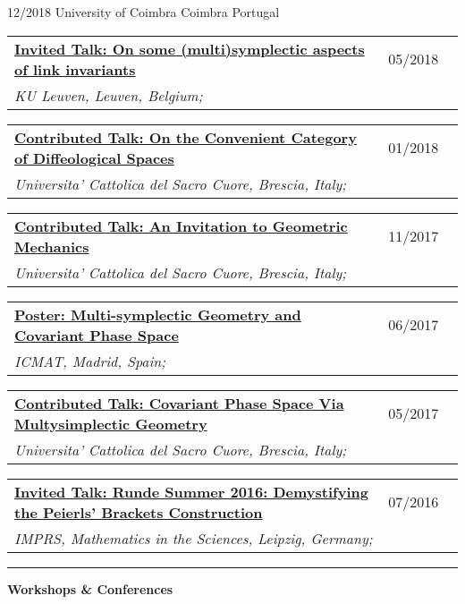 \documentclass[a4paper]{article}
\newcommand{\block}[1]{\hrule \vspace{0.2cm} \textbf{\Large #1} \vspace{0.2cm}}
\newcommand{\longvoice}[8]{
    \begin{tabular}{p{0.83\linewidth} p{0.17\linewidth} }
        \textbf{\href{#3}{#2: #1}} & #4 
        \\ 
        \textit{#5, #6, #7;} & {\small\emph{#8}}
    \end{tabular}
    \vspace{.5em}
}
\begin{document}
        {12/2018}
        {University of Coimbra}
        {Coimbra}
        {Portugal}
        {}
    \longvoice{On some (multi)symplectic aspects of link invariants}
        {Invited Talk}
        {https://web.archive.org/web/20180424133109/https://wis.kuleuven.be/agenda/sem-geometry/academic-year-2017-2018/seminar_differential_geometry_Miti}
        {05/2018}
        {KU Leuven}
        {Leuven}
        {Belgium}
        {}
    \longvoice{On the Convenient Category of Diffeological Spaces}
        {Contributed Talk}
        {https://www.dropbox.com/s/thm6unntpduynh3/1801-Talk-ConvenientDiffeological.pdf?dl=0}
        {01/2018}
        {Universita' Cattolica del Sacro Cuore}
        {Brescia}
        {Italy}
        {}
    \longvoice{An Invitation to Geometric Mechanics}
        {Contributed Talk}
        {https://www.dropbox.com/s/k066hn2ubovhaop/1711-talk-invitationGeoMec.pdf?dl=0}
        {11/2017}
        {Universita' Cattolica del Sacro Cuore}
        {Brescia}
        {Italy}
        {}
    \longvoice{Multi-symplectic Geometry and Covariant Phase Space}
        {Poster}
        {https://www.researchgate.net/publication/319301416_Multi-symplectic_Geometry_and_Covariant_Phase_Space}
        {06/2017}
        {ICMAT}
        {Madrid}
        {Spain}
        {}
    \longvoice{Covariant Phase Space Via Multysimplectic Geometry}
        {Contributed Talk}
        {https://www.researchgate.net/publication/319301194_Notes_on_Covariant_Phase_Space_via_MultiSymplectic_Geometry}
        {05/2017}
        {Universita' Cattolica del Sacro Cuore}
        {Brescia}
        {Italy}
        {}
    \longvoice{Runde Summer 2016: Demystifying the Peierls' Brackets Construction}
        {Invited Talk}
        {https://www.dropbox.com/s/slk28t877e2nxtq/1607-Liepzig-RundeSummer.PDF?dl=0}
        {07/2016}
        {IMPRS, Mathematics in the Sciences}
        {Leipzig}
        {Germany}
        {}





    \block{Workshops \& Conferences}
\end{document}
